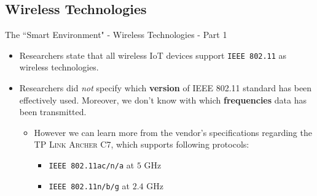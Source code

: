\documentclass[13.5pt]{beamer}
\begin{document}
\subsection{Wireless Technologies}
\begin{frame}{The ``Smart Environment" - Wireless Technologies - Part 1}

\begin{itemize}
\justifying
\item Researchers state that all wireless IoT devices support \texttt{IEEE 802.11} as wireless technologies.

\item Researchers did \textit{not} specify which \textbf{version} of IEEE 802.11 standard has been effectively used. Moreover, we don't know with which \textbf{frequencies} data has been transmitted.

\begin{itemize}
\justifying
\item However we can learn more from the vendor's specifications regarding the \textsc{TP Link Archer C7}, which supports following protocols:

\begin{itemize}
\item \texttt{IEEE 802.11ac/n/a} at $5$ GHz
\item \texttt{IEEE 802.11n/b/g} at $2.4$ GHz
\end{itemize}
\end{itemize}

\end{itemize}

\end{frame} 
\end{document}
